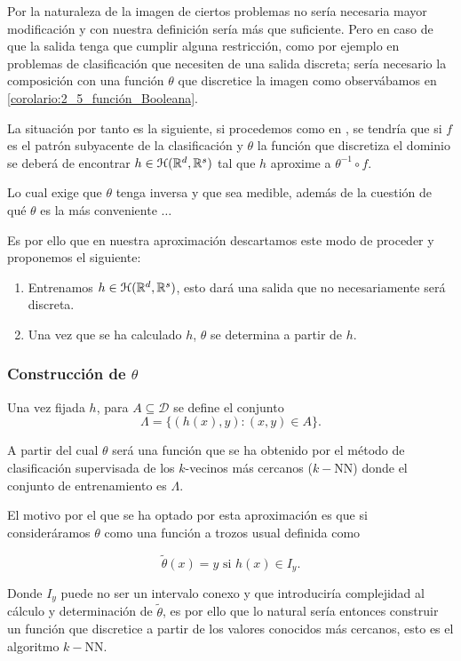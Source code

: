 Por la naturaleza de la imagen de ciertos problemas no sería 
necesaria mayor modificación y con nuestra definición sería 
más que suficiente. Pero en caso de que la salida tenga que cumplir alguna restricción, como por ejemplo en 
problemas de clasificación que necesiten de una salida discreta; sería necesario la composición con una función 
$\theta$ que discretice la imagen como observábamos en \ref{corolario:2_5_función_Booleana}.  


La situación por tanto es la siguiente, si procedemos como en , 
se tendría que si $f$ es el patrón subyacente de la clasificación 
y $\theta$ la función que discretiza el dominio se deberá de encontrar 
$h \in \mathcal{H}(\mathbb{R}^d,\mathbb{R}^s)$ tal que $h$ aproxime a $\theta^{-1} \circ f$.

Lo cual exige que $\theta$ tenga inversa y que sea medible, además de la cuestión de qué $\theta$ es la más conveniente $\dots$
\newpage
\begin{aportacionOriginal} %
    
Es por ello que en nuestra aproximación descartamos este modo de proceder y proponemos el siguiente: 

\begin{enumerate}
    \item Entrenamos $h\in \mathcal{H}(\mathbb{R}^d,\mathbb{R}^s)$, esto dará una salida que no necesariamente será discreta. 
    \item Una vez que se ha calculado $h$,  $\theta$ se determina a partir de $h$. 
\end{enumerate}

\subsubsection*{Construcción de  $\theta$}

Una vez fijada $h$,  para $A \subseteq \mathcal{D}$ se define  el conjunto 
\begin{equation}
    \Lambda = \{(h(x), y) : (x,y) \in A\}.
\end{equation}

A partir del cual $\theta$ será una función que se ha obtenido por el método de clasificación supervisada de los $k$-vecinos más cercanos ($k-$NN) donde el conjunto de entrenamiento es $\Lambda$.

El motivo por el que se ha optado por esta aproximación es que si consideráramos $\theta$ como una función a trozos usual definida como 

\begin{equation}
    \tilde{\theta}(x) = y \text{ si } h(x) \in I_y.
\end{equation}

Donde $I_y$ puede no ser un intervalo conexo y que introduciría complejidad al cálculo y determinación de $\tilde{\theta}$, es por ello que lo natural sería entonces construir un función que discretice a partir de los valores conocidos más cercanos, esto es el algoritmo $k-$NN.  

\end{aportacionOriginal}  %

